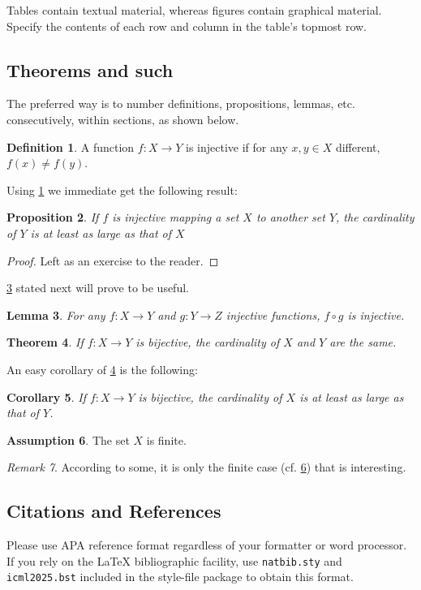 \documentclass{article}
\theoremstyle{plain}
\newtheorem{theorem}{Theorem}[section]
\newtheorem{proposition}[theorem]{Proposition}
\newtheorem{lemma}[theorem]{Lemma}
\newtheorem{corollary}[theorem]{Corollary}
\theoremstyle{definition}
\newtheorem{definition}[theorem]{Definition}
\newtheorem{assumption}[theorem]{Assumption}
\theoremstyle{remark}
\newtheorem{remark}[theorem]{Remark}
\begin{document}
Tables contain textual material, whereas figures contain graphical material.
Specify the contents of each row and column in the table's topmost
row. 

\subsection{Theorems and such}
The preferred way is to number definitions, propositions, lemmas, etc. consecutively, within sections, as shown below.
\begin{definition}
\label{def:inj}
A function $f:X \to Y$ is injective if for any $x,y\in X$ different, $f(x)\ne f(y)$.
\end{definition}
Using \cref{def:inj} we immediate get the following result:
\begin{proposition}
If $f$ is injective mapping a set $X$ to another set $Y$, 
the cardinality of $Y$ is at least as large as that of $X$
\end{proposition}
\begin{proof} 
Left as an exercise to the reader. 
\end{proof}
\cref{lem:usefullemma} stated next will prove to be useful.
\begin{lemma}
\label{lem:usefullemma}
For any $f:X \to Y$ and $g:Y\to Z$ injective functions, $f \circ g$ is injective.
\end{lemma}
\begin{theorem}
\label{thm:bigtheorem}
If $f:X\to Y$ is bijective, the cardinality of $X$ and $Y$ are the same.
\end{theorem}
An easy corollary of \cref{thm:bigtheorem} is the following:
\begin{corollary}
If $f:X\to Y$ is bijective, 
the cardinality of $X$ is at least as large as that of $Y$.
\end{corollary}
\begin{assumption}
The set $X$ is finite.
\label{ass:xfinite}
\end{assumption}
\begin{remark}
According to some, it is only the finite case (cf. \cref{ass:xfinite}) that is interesting.
\end{remark}

\subsection{Citations and References}

Please use APA reference format regardless of your formatter
or word processor. If you rely on the \LaTeX\/ bibliographic
facility, use \texttt{natbib.sty} and \texttt{icml2025.bst}
included in the style-file package to obtain this format.
\end{document}
